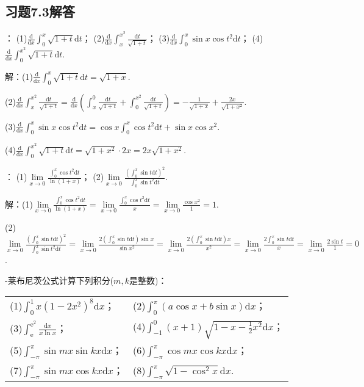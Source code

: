 \documentclass[12pt,UTF8]{ctexart}
\begin{document}
\subsection{习题7.3解答}
\begin{enumerate}
：
\newline
(1)$\frac{\mathrm d}{\mathrm dx}\int_0^x\sqrt{1+t}\mathrm dt$；
\newline
(2)$\frac{\mathrm d}{\mathrm dx}\int_x^{x^2}\frac{\mathrm dt}{\sqrt{1+t}}$；
\newline
(3)$\frac{\mathrm d}{\mathrm dx}\int_0^x\sin x\cos t^2\mathrm dt$；
\newline
(4)$\frac{\mathrm d}{\mathrm dx}\int_0^{x^2}\sqrt{1+t}\mathrm dt$.

解：(1)$\frac{\mathrm d}{\mathrm dx}\int_0^x\sqrt{1+t}\mathrm dt=\sqrt{1+x}$.

(2)$\frac{\mathrm d}{\mathrm dx}\int_x^{x^2}\frac{\mathrm dt}{\sqrt{1+t}}=\frac{\mathrm d}{\mathrm dx}(\int_x^0\frac{\mathrm dt}{\sqrt{1+t}}+\int_0^{x^2}\frac{\mathrm dt}{\sqrt{1+t}})=-\frac1{\sqrt{1+x}}+\frac{2x}{\sqrt{1+x^2}}$.

(3)$\frac{\mathrm d}{\mathrm dx}\int_0^x\sin x\cos t^2\mathrm dt=\cos x\int_0^x\cos t^2\mathrm dt+\sin x\cos x^2$.

(4)$\frac{\mathrm d}{\mathrm dx}\int_0^{x^2}\sqrt{1+t}\mathrm dt=\sqrt{1+x^2}\cdot2x=2x\sqrt{1+x^2}$.

：
\newline
(1)$\lim\limits_{x\rightarrow0}\frac{\int_0^x\cos t^2\mathrm dt}{\ln(1+x)}$；
\newline
(2)$\lim\limits_{x\rightarrow0}\frac{(\int_0^x\sin t\mathrm dt)^2}{\int_0^x\sin t^2\mathrm dt}$.

解：(1)$\lim\limits_{x\rightarrow0}\frac{\int_0^x\cos t^2\mathrm dt}{\ln(1+x)}=\lim\limits_{x\rightarrow0}\frac{\int_0^x\cos t^2\mathrm dt}x=\lim\limits_{x\rightarrow0}\frac{\cos x^2}1=1$.

(2)$\lim\limits_{x\rightarrow0}\frac{(\int_0^x\sin t\mathrm dt)^2}{\int_0^x\sin t^2\mathrm dt}=\lim\limits_{x\rightarrow0}\frac{2(\int_0^x\sin t\mathrm dt)\sin x}{\sin x^2}=\lim\limits_{x\rightarrow0}\frac{2(\int_0^x\sin t\mathrm dt)x}{x^2}=\lim\limits_{x\rightarrow0}\frac{2\int_0^x\sin t\mathrm dt}x=\lim\limits_{x\rightarrow0}\frac{2\sin t}1=0$.

-莱布尼茨公式计算下列积分($m,k$是整数)：
\newline
\begin{tabular}{ll}
(1)$\int_0^1x(1-2x^2)^8\mathrm dx$；&(2)$\int_0^\pi(a\cos x+b\sin x)\mathrm dx$；\\
(3)$\int_{\mathrm e}^{\mathrm e^2}\frac{\mathrm dx}{x\ln x}$；&(4)$\int_{-1}^0(x+1)\sqrt{1-x-\frac12x^2}\mathrm dx$；\\
(5)$\int_{-\pi}^\pi\sin mx\sin kx\mathrm dx$；&(6)$\int_{-\pi}^\pi\cos mx\cos kx\mathrm dx$；\\
(7)$\int_{-\pi}^\pi\sin mx\cos kx\mathrm dx$；&(8)$\int_{-\pi}^\pi\sqrt{1-\cos^2x}\mathrm dx$.
\end{tabular}


\end{enumerate}
\end{document}
